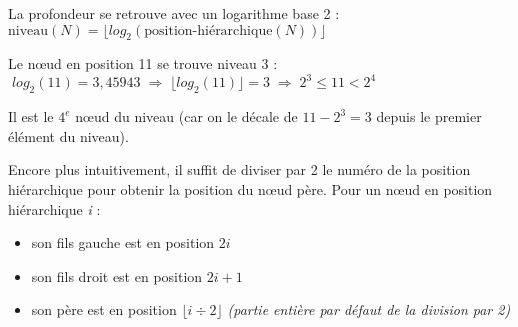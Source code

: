 \documentclass[11pt,a4paper]{article}
\begin{document}
La profondeur se retrouve avec un logarithme base 2 : $ \text{niveau}(N) = \lfloor log_{2}(\text{position-hiérarchique}(N)) \rfloor $

Le nœud en position 11 se trouve niveau 3 : $ \; log_{2}(11) = 3,45943 \; \Rightarrow \; \lfloor log_{2}(11) \rfloor = 3 \; \Rightarrow \; 2^{3} \leq 11 < 2^{4} $

Il est le $4^{e}$ nœud du niveau (car on le décale de $11 - 2^{3} = 3$ depuis le premier élément du niveau).

\medskip

%

Encore plus intuitivement, il suffit de diviser par 2 le numéro de la position hiérarchique pour obtenir la position du nœud père.
%
Pour un nœud en position hiérarchique \textit{i} :
\begin{itemize}
\item son fils gauche est en position $ 2i $
\item son fils droit est en position $ 2i + 1 $
\item son père est en position $ \lfloor i \div 2 \rfloor $ \footnotesize{\textit{(partie entière par défaut de la division par 2)}}
\end{itemize}
\end{document}
